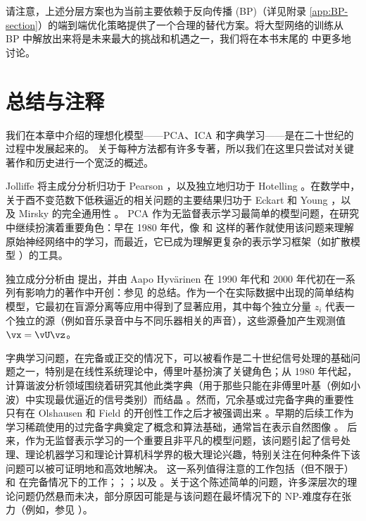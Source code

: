 \documentclass[../../book-main.tex]{subfiles}
\begin{document}
请注意，上述分层方案也为当前主要依赖于反向传播 (BP)（详见附录 \ref{app:BP-section}）的端到端优化策略提供了一个合理的替代方案。将大型网络的训练从 BP 中解放出来将是未来最大的挑战和机遇之一，我们将在本书末尾的  中更多地讨论。


\section{总结与注释}

我们在本章中介绍的理想化模型——PCA、ICA 和字典学习——是在二十世纪的过程中发展起来的。
关于每种方法都有许多专著，所以我们在这里只尝试对关键著作和历史进行一个宽泛的概述。

Jolliffe \cite{Jolliffe1986} 将主成分分析归功于 Pearson \cite{Pearson1901}，以及独立地归功于 Hotelling \cite{Hotelling1933}。在数学中，关于酉不变范数下低秩逼近的相关问题的主要结果归功于 Eckart 和 Young \cite{Eckart1936-ep}，以及 Mirsky 的完全通用性 \cite{Mirsky1960-ek}。
PCA 作为无监督表示学习最简单的模型问题，在研究中继续扮演着重要角色：早在 1980 年代，像 \textcite{Oja1982SimplifiedNM} 和 \textcite{Baldi89} 这样的著作就使用该问题来理解原始神经网络中的学习，而最近，它已成为理解更复杂的表示学习框架（如扩散模型 \cite{wang2024diffusion}）的工具。

独立成分分析由 \textcite{Ans-1985} 提出，并由 Aapo Hyvärinen 在 1990 年代和 2000 年代初在一系列有影响力的著作中开创：参见 \textcite{Hyvrinen-2000} 的总结。作为一个在实际数据中出现的简单结构模型，它最初在盲源分离等应用中得到了显著应用，其中每个独立分量 $z_i$ 代表一个独立的源（例如音乐录音中与不同乐器相关的声音），这些源叠加产生观测值 $\vx = \vU \vz$。

字典学习问题，在完备或正交的情况下，可以被看作是二十世纪信号处理的基础问题之一，特别是在线性系统理论中，傅里叶基扮演了关键角色；从 1980 年代起，计算谐波分析领域围绕着研究其他此类字典（用于那些只能在非傅里叶基（例如小波）中实现最优逼近的信号类别）而结晶 \cite{Donoho1998-zf}。然而，冗余基或过完备字典的重要性只有在 Olshausen 和 Field 的开创性工作之后才被强调出来 \cite{Olshausen1996-ap,Olshausen1997-yv}。早期的后续工作为学习稀疏使用的过完备字典奠定了概念和算法基础，通常旨在表示自然图像 \cite{Donoho2001-tl,DonohoD2003-PNAS,Elad2006-yi,Murray2007-cw,aharon2006k,Mairal2014-nq,Gribonval2015-fy}。
后来，作为无监督表示学习的一个重要且非平凡的模型问题，该问题引起了信号处理、理论机器学习和理论计算机科学界的极大理论兴趣，特别关注在何种条件下该问题可以被可证明地和高效地解决。
这一系列值得注意的工作包括（但不限于）\textcite{Spielman2012-tl} 和 \textcite{sun2017complete_a} 在完备情况下的工作；\textcite{pmlr-v40-Arora15}；\textcite{Barak2015-uu}；以及 \textcite{Qu2020Geometric}。关于这个陈述简单的问题，许多深层次的理论问题仍然悬而未决，部分原因可能是与该问题在最坏情况下的 NP-难度存在张力（例如，参见 \textcite{Tillmann2015-up}）。
\end{document}

